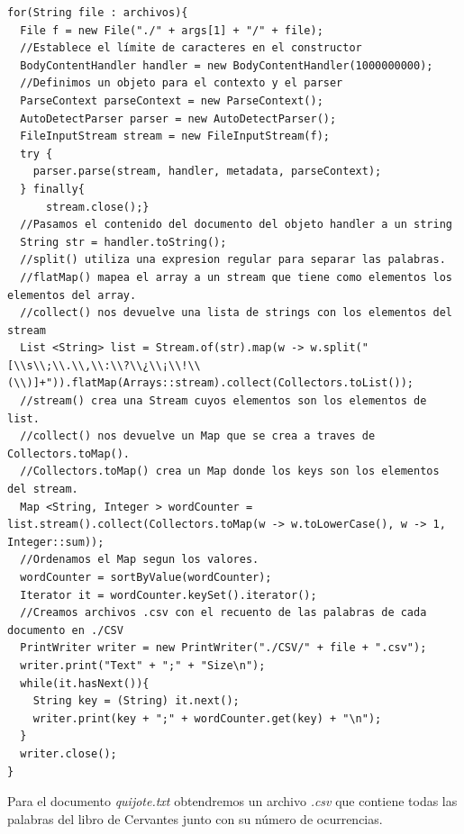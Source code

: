 \documentclass[12pt]{article}
\begin{document}
\begin{lstlisting}
for(String file : archivos){
  File f = new File("./" + args[1] + "/" + file);
  //Establece el límite de caracteres en el constructor
  BodyContentHandler handler = new BodyContentHandler(1000000000);
  //Definimos un objeto para el contexto y el parser
  ParseContext parseContext = new ParseContext();
  AutoDetectParser parser = new AutoDetectParser();
  FileInputStream stream = new FileInputStream(f);
  try {
    parser.parse(stream, handler, metadata, parseContext);
  } finally{
      stream.close();}
  //Pasamos el contenido del documento del objeto handler a un string
  String str = handler.toString();
  //split() utiliza una expresion regular para separar las palabras.
  //flatMap() mapea el array a un stream que tiene como elementos los elementos del array. 
  //collect() nos devuelve una lista de strings con los elementos del stream
  List <String> list = Stream.of(str).map(w -> w.split("[\\s\\;\\.\\,\\:\\?\\¿\\¡\\!\\(\\)]+")).flatMap(Arrays::stream).collect(Collectors.toList());
  //stream() crea una Stream cuyos elementos son los elementos de list.
  //collect() nos devuelve un Map que se crea a traves de Collectors.toMap(). 
  //Collectors.toMap() crea un Map donde los keys son los elementos del stream. 
  Map <String, Integer > wordCounter = list.stream().collect(Collectors.toMap(w -> w.toLowerCase(), w -> 1, Integer::sum));
  //Ordenamos el Map segun los valores.
  wordCounter = sortByValue(wordCounter);
  Iterator it = wordCounter.keySet().iterator();
  //Creamos archivos .csv con el recuento de las palabras de cada documento en ./CSV
  PrintWriter writer = new PrintWriter("./CSV/" + file + ".csv");
  writer.print("Text" + ";" + "Size\n");
  while(it.hasNext()){
    String key = (String) it.next();
    writer.print(key + ";" + wordCounter.get(key) + "\n");
  }
  writer.close();
}
\end{lstlisting}

\clearpage

Para el documento \textit{quijote.txt} obtendremos un archivo \textit{.csv} que contiene todas las palabras del libro de Cervantes junto con su número de ocurrencias.\\
\end{document}
